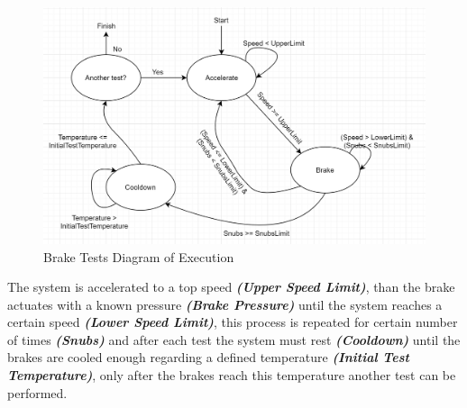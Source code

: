 			\begin{figure}[htbp]
				\centering
				\includegraphics[scale=0.5]{figuras/fig-brake-test-diagram}
				\caption{Brake Tests Diagram of Execution}
				\label{fig:brake-test-diagram}
			\end{figure}

			The system is accelerated to a top speed \textit{\textbf{(Upper Speed Limit)}}, than the brake actuates with a known pressure \textit{\textbf{(Brake Pressure)}} until the system reaches a certain speed \textit{\textbf{(Lower Speed Limit)}}, this process is repeated for certain number of times \textit{\textbf{(Snubs)}} and after each test the system must rest \textit{\textbf{(Cooldown)}} until the brakes are cooled enough regarding a defined temperature \textit{\textbf{(Initial Test Temperature)}}, only after the brakes reach this temperature another test can be performed.